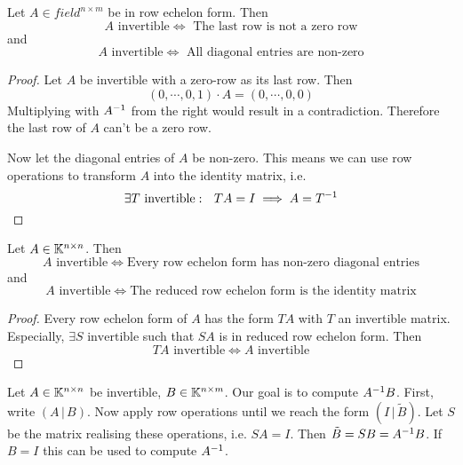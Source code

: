\documentclass[../../script.tex]{subfiles}
\begin{document}
\begin{lem}
	Let $A \in field^{n \times m}$ be in row echelon form. Then
	\[
		A \text{ invertible} \iff \text{ The last row is not a zero row}	
	\]
	and
	\[
		A \text{ invertible} \iff \text{ All diagonal entries are non-zero}
	\]
\end{lem}
\begin{proof}
	Let $A$ be invertible with a zero-row as its last row. Then
	\begin{equation}
		(0, \cdots, 0, 1) \cdot A = (0, \cdots, 0, 0)
	\end{equation}
	Multiplying with ${A}^{-1}$ from the right would result in a contradiction. Therefore the last row of $A$ can't be a zero row.

	Now let the diagonal entries of $A$ be non-zero. This means we can use row operations to transform $A$ into the identity matrix, i.e.
	\begin{equation}
		\exists T \text{ invertible}: ~~TA = I \implies A = {T}^{-1}
	\end{equation}
\end{proof}

\begin{cor}
	Let $A \in \mathbb{K}^{n \times n}$. Then 
	\[
		A \text{ invertible} \iff \text{Every row echelon form has non-zero diagonal entries}	
	\]
	and
	\[
		A \text{ invertible} \iff \text{The reduced row echelon form is the identity matrix}	
	\]
\end{cor}
\begin{proof}
	Every row echelon form of $A$ has the form $TA$ with $T$ an invertible matrix. Especially, $\exists S \text{ invertible}$ such that $SA$ is 
	in reduced row echelon form. Then
	\begin{equation}
		TA \text{ invertible} \iff A \text{ invertible}
	\end{equation}
\end{proof}

\begin{rem}
	Let $A \in \mathbb{K}^{n \times n}$ be invertible, $B \in \mathbb{K}^{n \times m}$. Our goal is to compute ${A}^{-1}B$. First, write $(A \,\vert\, B)$.
	Now apply row operations until we reach the form $(I \,\vert\, \tilde{B})$. Let $S$ be the matrix realising these operations, i.e. $SA = I$. 
	Then $\tilde{B} = SB = {A}^{-1}B$. If $B = I$ this can be used to compute ${A}^{-1}$.
\end{rem}
\end{document}
